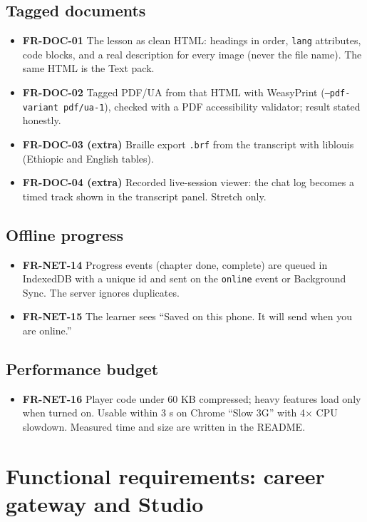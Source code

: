 \documentclass[11pt,a4paper]{article}
\newcommand{\code}[1]{\texttt{#1}}
\newcommand{\req}[1]{\textbf{#1}}
\begin{document}
\subsection{Tagged documents}
\begin{itemize}
  \item \req{FR-DOC-01} The lesson as clean HTML: headings in order, \code{lang} attributes, code blocks, and a real description for every image (never the file name). The same HTML is the Text pack.
  \item \req{FR-DOC-02} Tagged PDF/UA from that HTML with WeasyPrint (\code{--pdf-variant pdf/ua-1}), checked with a PDF accessibility validator; result stated honestly.
  \item \req{FR-DOC-03 (extra)} Braille export \code{.brf} from the transcript with liblouis (Ethiopic and English tables).
  \item \req{FR-DOC-04 (extra)} Recorded live-session viewer: the chat log becomes a timed track shown in the transcript panel. Stretch only.
\end{itemize}

\subsection{Offline progress}
\begin{itemize}
  \item \req{FR-NET-14} Progress events (chapter done, complete) are queued in IndexedDB with a unique id and sent on the \code{online} event or Background Sync. The server ignores duplicates.
  \item \req{FR-NET-15} The learner sees ``Saved on this phone. It will send when you are online.''
\end{itemize}

\subsection{Performance budget}
\begin{itemize}
  \item \req{FR-NET-16} Player code under 60 KB compressed; heavy features load only when turned on. Usable within 3 s on Chrome ``Slow 3G'' with 4$\times$ CPU slowdown. Measured time and size are written in the README.
\end{itemize}

\section{Functional requirements: career gateway and Studio}
\end{document}
